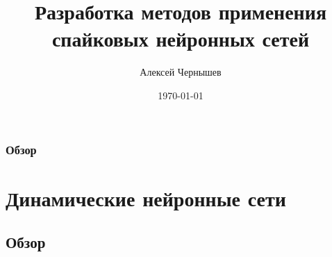 \documentclass{beamer}
\title[Спайковые нейросетевые методы]{Разработка методов применения спайковых нейронных сетей} %
\author{Алексей Чернышев} %
\institute[BMSTU] %
{
Аспирант РК 6\\
Научный руководитель:\\ д.ф.-м.н Анатолий Павлович Карпенко\\
\medskip
МГТУ им. Н.Э. Баумана \\ %
\medskip
\textit{alexey.chernushev@gmail.com} %
}
\date{\today} %
\begin{document}
\begin{frame}
\titlepage %
\end{frame}

\begin{frame}
\frametitle{Обзор} %
\tableofcontents %
\end{frame}


\section{Динамические нейронные сети} %
\frame{\tableofcontents[currentsection]}
\subsection{Обзор} %
\end{document}
